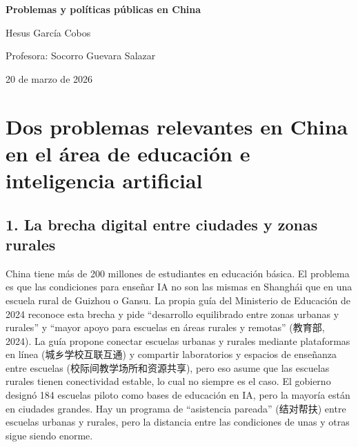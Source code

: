 \documentclass[12pt,a4paper]{article}
\newcommand{\zh}[1]{{\cjkfont #1}}
\begin{document}
\begin{titlepage}
\centering
\vspace*{3cm}

{\LARGE\bfseries Problemas y políticas públicas en China\par}

\vspace{2cm}

{\large Hesus García Cobos\par}

\vspace{1cm}

{\large Profesora: Socorro Guevara Salazar\par}

\vspace{1cm}

{\large 20 de marzo de 2026\par}

\vfill
\end{titlepage}


\section*{Dos problemas relevantes en China en el área de educación e inteligencia artificial}

\subsection*{1. La brecha digital entre ciudades y zonas rurales}

China tiene más de 200 millones de estudiantes en educación básica. El problema es que las condiciones para enseñar IA no son las mismas en Shanghái que en una escuela rural de Guizhou o Gansu. La propia guía del Ministerio de Educación de 2024 reconoce esta brecha y pide ``desarrollo equilibrado entre zonas urbanas y rurales'' y ``mayor apoyo para escuelas en áreas rurales y remotas'' (\zh{教育部}, 2024). La guía propone conectar escuelas urbanas y rurales mediante plataformas en línea (\zh{城乡学校互联互通}) y compartir laboratorios y espacios de enseñanza entre escuelas (\zh{校际间教学场所和资源共享}), pero eso asume que las escuelas rurales tienen conectividad estable, lo cual no siempre es el caso. El gobierno designó 184 escuelas piloto como bases de educación en IA, pero la mayoría están en ciudades grandes. Hay un programa de ``asistencia pareada'' (\zh{结对帮扶}) entre escuelas urbanas y rurales, pero la distancia entre las condiciones de unas y otras sigue siendo enorme.
\end{document}
